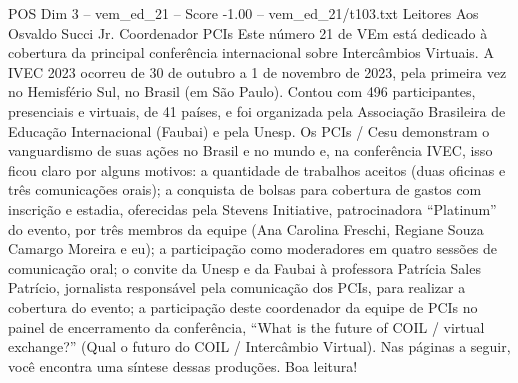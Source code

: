 \begin{textsample}{POS Dim 3 – vem\_ed\_21 – Score -1.00 – vem\_ed\_21/t103.txt}  \label{ex:f3_pos_070}
Leitores Aos Osvaldo Succi Jr.
Coordenador PCIs Este número 21 de VEm está dedicado à cobertura da principal conferência internacional sobre Intercâmbios Virtuais.
A IVEC 2023 ocorreu de 30 de outubro a 1 de novembro de 2023, pela primeira vez no Hemisfério Sul, no Brasil (em São Paulo).
Contou com 496 participantes, presenciais e virtuais, de 41 países, e foi organizada pela Associação Brasileira de Educação Internacional (Faubai) e pela Unesp.
Os PCIs / Cesu demonstram o vanguardismo de suas ações no Brasil e no mundo e, na conferência IVEC, isso ficou claro por alguns motivos: a quantidade de trabalhos aceitos (duas oficinas e três comunicações orais); a conquista de bolsas para cobertura de gastos com inscrição e estadia, oferecidas pela Stevens Initiative, patrocinadora “Platinum” do evento, por três membros da equipe (Ana Carolina Freschi, Regiane Souza Camargo Moreira e eu); a participação como moderadores em quatro sessões de comunicação oral; o convite da Unesp e da Faubai à professora Patrícia Sales Patrício, jornalista responsável pela comunicação dos PCIs, para realizar a cobertura do evento; a participação deste coordenador da equipe de PCIs no painel de encerramento da conferência, “What is the future of COIL / virtual exchange?” (Qual o futuro do COIL / Intercâmbio Virtual).
Nas páginas a seguir, você encontra uma síntese dessas produções.
Boa leitura!

\end{textsample}
